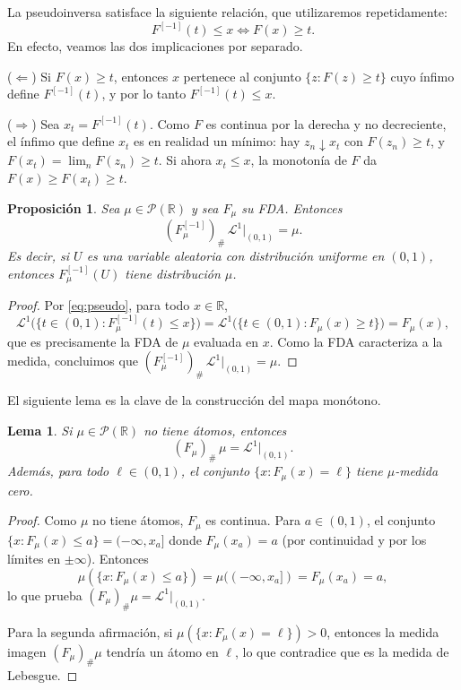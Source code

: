 \documentclass[12pt, a4paper]{amsbook}
\newcommand{\R}{{\mathbb R}}
\newtheorem{lema}[teo]{Lema}
\newtheorem{prop}[teo]{Proposición}
\theoremstyle{remark}
\theoremstyle{definition}
\numberwithin{section}{chapter}
\numberwithin{subsection}{section}
\numberwithin{equation}{section}
\numberwithin{figure}{chapter}
\begin{document}
La pseudoinversa satisface la siguiente relación, que utilizaremos
repetidamente:
\begin{equation}\label{eq:pseudo}
F^{[-1]}(t)\le x
\iff
F(x)\ge t.
\end{equation}
En efecto, veamos las dos implicaciones por separado.

($\Leftarrow$) Si $F(x)\ge t$, entonces $x$ pertenece al conjunto
$\{z\colon F(z)\ge t\}$ cuyo ínfimo define $F^{[-1]}(t)$, y por lo tanto
$F^{[-1]}(t)\le x$.

($\Rightarrow$) Sea $x_t=F^{[-1]}(t)$. Como $F$ es continua por la derecha y
no decreciente, el ínfimo que define $x_t$ es en realidad un mínimo: hay
$z_n\downarrow x_t$ con $F(z_n)\ge t$, y $F(x_t)=\lim_nF(z_n)\ge t$. Si
ahora $x_t\le x$, la monotonía de $F$ da $F(x)\ge F(x_t)\ge t$.

\begin{prop}\label{prop:push-uniforme}
Sea $\mu\in\mathcal P(\R)$ y sea $F_\mu$ su FDA. Entonces
\[
(F_\mu^{[-1]})_\#\,\mathcal L^1|_{(0,1)}=\mu.
\]
Es decir, si $U$ es una variable aleatoria con distribución uniforme en $(0,1)$,
entonces $F_\mu^{[-1]}(U)$ tiene distribución $\mu$.
\end{prop}
\begin{proof}
Por \eqref{eq:pseudo}, para todo $x\in\R$,
\[
\mathcal L^1\bigl(\{t\in(0,1):F_\mu^{[-1]}(t)\le x\}\bigr)
=
\mathcal L^1\bigl(\{t\in(0,1):F_\mu(x)\ge t\}\bigr)
=
F_\mu(x),
\]
que es precisamente la FDA de $\mu$ evaluada en $x$. Como la FDA caracteriza
a la medida, concluimos que $(F_\mu^{[-1]})_\#\,\mathcal L^1|_{(0,1)}=\mu$.
\end{proof}

El siguiente lema es la clave de la construcción del mapa monótono.

\begin{lema}\label{lema:push-lebesgue}
Si $\mu\in\mathcal P(\R)$ no tiene átomos, entonces
\[
(F_\mu)_\#\,\mu=\mathcal L^1|_{(0,1)}.
\]
Además, para todo $\ell\in(0,1)$, el conjunto $\{x\colon F_\mu(x)=\ell\}$ tiene
$\mu$-medida cero.
\end{lema}
\begin{proof}
Como $\mu$ no tiene átomos, $F_\mu$ es continua. Para $a\in(0,1)$, el conjunto
$\{x:F_\mu(x)\le a\}=(-\infty,x_a]$ donde $F_\mu(x_a)=a$ (por continuidad y
por los límites en $\pm\infty$). Entonces
\[
\mu(\{x\colon F_\mu(x)\le a\})=\mu((-\infty,x_a])=F_\mu(x_a)=a,
\]
lo que prueba $(F_\mu)_\#\mu=\mathcal L^1|_{(0,1)}$.

Para la segunda afirmación, si $\mu(\{x\colon F_\mu(x)=\ell\})>0$, entonces la medida
imagen $(F_\mu)_\#\mu$ tendría un átomo en $\ell$, lo que contradice que es la medida
de Lebesgue.
\end{proof}
\end{document}
